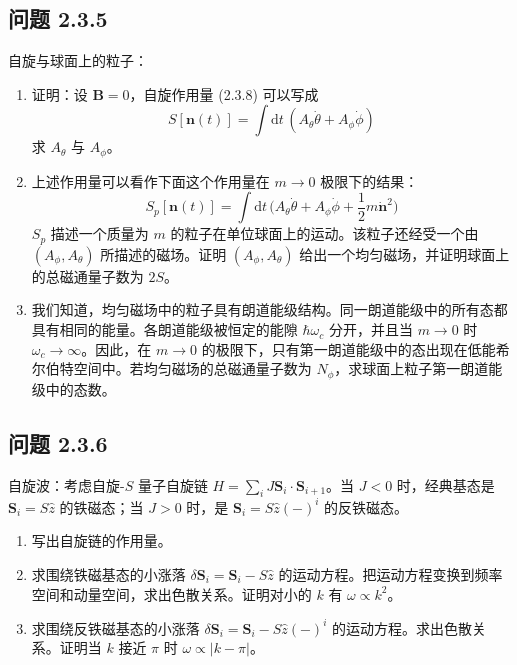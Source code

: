 \subsection*{问题 2.3.5}
自旋与球面上的粒子：
\begin{enumerate}
\item 证明：设 $\pmb{B} = 0$，自旋作用量 (2.3.8) 可以写成
\begin{equation*}
S[\pmb{n}(t)] = \int \mathrm{d}t\, (A_{\theta}\dot{\theta} + A_{\phi}\dot{\phi})
\end{equation*}
求 $A_{\theta}$ 与 $A_{\phi}$。
\item 上述作用量可以看作下面这个作用量在 $m \to 0$ 极限下的结果：
\begin{equation*}
S_p[\pmb{n}(t)] = \int \mathrm{d}t\, \Big(A_{\theta}\dot{\theta} + A_{\phi}\dot{\phi} + \frac{1}{2}m\dot{\pmb{n}}^2\Big)
\end{equation*}
$S_p$ 描述一个质量为 $m$ 的粒子在单位球面上的运动。该粒子还经受一个由 $(A_{\phi}, A_{\theta})$ 所描述的磁场。证明 $(A_{\phi}, A_{\theta})$ 给出一个均匀磁场，并证明球面上的总磁通量子数为 $2S$。
\item 我们知道，均匀磁场中的粒子具有朗道能级结构。同一朗道能级中的所有态都具有相同的能量。各朗道能级被恒定的能隙 $\hbar\omega_c$ 分开，并且当 $m \to 0$ 时 $\omega_c \to \infty$。因此，在 $m \to 0$ 的极限下，只有第一朗道能级中的态出现在低能希尔伯特空间中。若均匀磁场的总磁通量子数为 $N_{\phi}$，求球面上粒子第一朗道能级中的态数。
\end{enumerate}

\subsection*{问题 2.3.6}
自旋波：考虑自旋-$S$ 量子自旋链 $H = \sum_i J\pmb{S}_i\cdot\pmb{S}_{i+1}$。当 $J < 0$ 时，经典基态是 $\pmb{S}_i = S\hat{z}$ 的铁磁态；当 $J > 0$ 时，是 $\pmb{S}_i = S\hat{z}(-)^i$ 的反铁磁态。
\begin{enumerate}
\item 写出自旋链的作用量。
\item 求围绕铁磁基态的小涨落 $\delta\pmb{S}_i = \pmb{S}_i - S\hat{z}$ 的运动方程。把运动方程变换到频率空间和动量空间，求出色散关系。证明对小的 $k$ 有 $\omega \propto k^2$。
\end{enumerate}

\begin{enumerate}
\setcounter{enumi}{2}
\item 求围绕反铁磁基态的小涨落 $\delta\pmb{S}_i = \pmb{S}_i - S\hat{z}(-)^i$ 的运动方程。求出色散关系。证明当 $k$ 接近 $\pi$ 时 $\omega \propto |k - \pi|$。
\end{enumerate}

